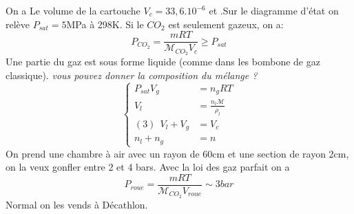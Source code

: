 \begin{Answer}
		On a Le volume de la cartouche $V_c= 33,6.10^{-6}$  et .Sur le diagramme d'état on relève $P_{sat} = 5 $MPa à 298K. Si le $CO_2$ est seulement gazeux, on a:
		\[ P_{CO_2} = \frac{mRT}{\mathcal{M}_{CO_2}V_c} \geq P_{sat} \]
		Une partie du gaz est sous forme liquide (comme dans les bombone de gaz classique).
		\emph{vous pouvez donner la composition du mélange ?}
		\[
		\begin{cases}
		P_{sat} V_g &= n_g R T \\
		V_l &= \frac{n_l \mathcal{M}}{\rho_l} \\
		(3)~~ V_l +V_g &=V_c \\
		n_l +n_g &= n
		\end{cases}\]
		On prend une chambre à air avec un rayon de 60cm et une section de rayon 2cm, on la veux gonfler entre 2 et 4 bars. Avec la loi des gaz parfait on a
		\[P_{roue} =    \frac{mRT}{\mathcal{M}_{CO_2}V_{roue}} \sim 3 bar \]
		Normal on les vends à Décathlon.
\end{Answer}
